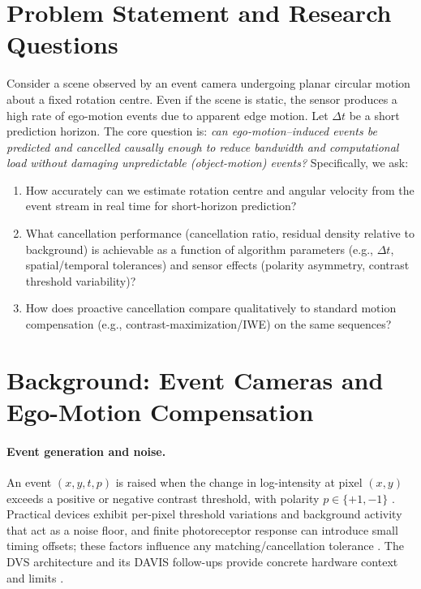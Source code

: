 \section{Problem Statement and Research Questions}

Consider a scene observed by an event camera undergoing planar circular motion about a fixed rotation centre. Even if the scene is static, the sensor produces a high rate of ego-motion events due to apparent edge motion. Let $\Delta t$ be a short prediction horizon. The core question is: \emph{can ego-motion–induced events be predicted and cancelled causally enough to reduce bandwidth and computational load without damaging unpredictable (object-motion) events?} Specifically, we ask:
\begin{enumerate}
    \item How accurately can we estimate rotation centre and angular velocity from the event stream in real time for short-horizon prediction? \cite{Gallego2017Angular,Gallego2018CMax}
    \item What cancellation performance (cancellation ratio, residual density relative to background) is achievable as a function of algorithm parameters (e.g., $\Delta t$, spatial/temporal tolerances) and sensor effects (polarity asymmetry, contrast threshold variability)? \cite{Gallego2020Survey,Xu2020SmoothMC}
    \item How does proactive cancellation compare qualitatively to standard motion compensation (e.g., contrast-maximization/IWE) on the same sequences? \cite{Gallego2018CMax,Bardow2016SOFIE,Stoffregen2019Segmentation}
\end{enumerate}

\section{Background: Event Cameras and Ego-Motion Compensation}

\paragraph{Event generation and noise.}
An event $(x,y,t,p)$ is raised when the change in log-intensity at pixel $(x,y)$ exceeds a positive or negative contrast threshold, with polarity $p \in \{+1,-1\}$ \cite{Gallego2020Survey}. Practical devices exhibit per-pixel threshold variations and background activity that act as a noise floor, and finite photoreceptor response can introduce small timing offsets; these factors influence any matching/cancellation tolerance \cite{Gallego2020Survey}. The DVS architecture and its DAVIS follow-ups provide concrete hardware context and limits \cite{Lichtsteiner2008DVS,Brandli2014DAVIS}.

